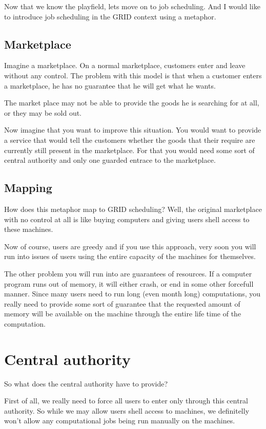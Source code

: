 \documentclass[12pt,a4paper]{article}
\begin{document}
Now that we know the playfield, lets move on to job scheduling.
And I would like to introduce job scheduling in the GRID context using a metaphor.

\subsection{Marketplace}

Imagine a marketplace. On a normal marketplace, customers enter and leave
without any control. The problem with this model is that when a customer enters
a marketplace, he has no guarantee that he will get what he wants.

The market place may not be able to provide the goods he is searching for at all, or they may be sold out.

Now imagine that you want to improve this situation.
You would want to provide a service that would tell the customers whether the goods that their require are currently still present in the marketplace.
For that you would need some sort of central authority and only one guarded entrace to the marketplace.

\subsection{Mapping}

How does this metaphor map to GRID scheduling? Well, the original marketplace
with no control at all is like buying computers and giving users shell access
to these machines.

Now of course, users are greedy and if you use this approach, very soon you
will run into issues of users using the entire capacity of the machines for
themselves.

The other problem you will run into are guarantees of resources. If a computer
program runs out of memory, it will either crash, or end in some other
forcefull manner. Since many users need to run long (even month long)
computations, you really need to provide some sort of guarantee that the
requested amount of memory will be available on the machine through the entire
life time of the computation.

\section{Central authority}

So what does the central authority have to provide?

First of all, we really need to force all users to enter only through this
central authority. So while we may allow users shell access to machines, we
definitelly won't allow any computational jobs being run manually on the machines.
\end{document}
